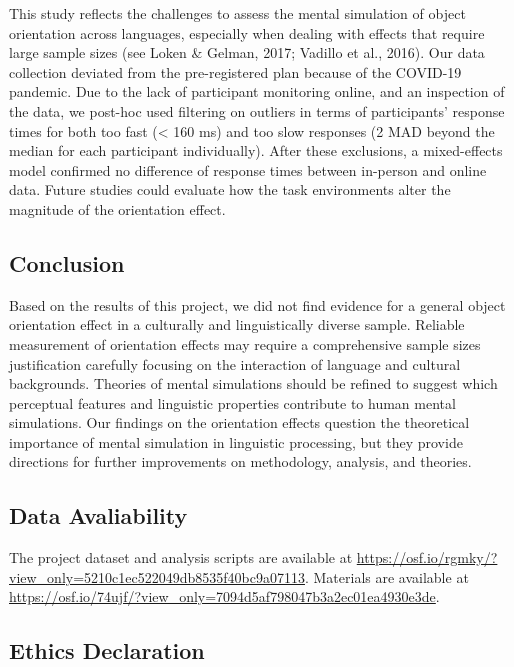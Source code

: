 \documentclass[
  man,floatsintext]{apa7}
\begin{document}
This study reflects the challenges to assess the mental simulation of
object orientation across languages, especially when dealing with
effects that require large sample sizes (see Loken \& Gelman, 2017; Vadillo et al., 2016). Our data collection deviated from
the pre-registered plan because of the COVID-19 pandemic. Due to the
lack of participant monitoring online, and an inspection of the data, we
post-hoc used filtering on outliers in terms of participants' response
times for both too fast (\textless{} 160 ms) and too slow responses (2 MAD beyond
the median for each participant individually). After these exclusions, a
mixed-effects model confirmed no difference of response times between
in-person and online data. Future studies could evaluate how the task
environments alter the magnitude of the orientation effect.

\hypertarget{conclusion}{%
\subsection{Conclusion}\label{conclusion}}

Based on the results of this project, we did not find evidence for a
general object orientation effect in a culturally and linguistically
diverse sample. Reliable measurement of orientation effects may require
a comprehensive sample sizes justification carefully focusing on the
interaction of language and cultural backgrounds. Theories of mental
simulations should be refined to suggest which perceptual features and
linguistic properties contribute to human mental simulations. Our
findings on the orientation effects question the theoretical importance
of mental simulation in linguistic processing, but they provide
directions for further improvements on methodology, analysis, and
theories.

\hypertarget{data-avaliability}{%
\subsection{Data Avaliability}\label{data-avaliability}}

The project dataset and analysis scripts are available at \url{https://osf.io/rgmky/?view_only=5210c1ec522049db8535f40bc9a07113}. Materials are available at \url{https://osf.io/74ujf/?view_only=7094d5af798047b3a2ec01ea4930e3de}.

\hypertarget{ethics-declaration}{%
\subsection{Ethics Declaration}\label{ethics-declaration}}
\end{document}
